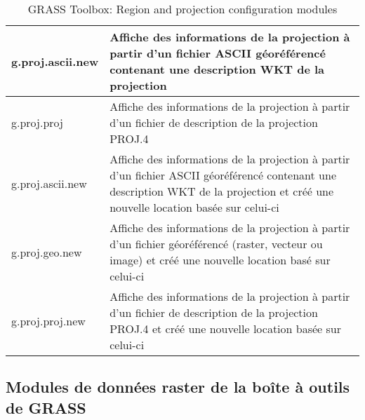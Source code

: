 \begin{table}[H]
\begin{tabular}{|p{4cm}|p{10cm}|}
  \hline g.proj.ascii.new & Affiche des informations de la projection à partir d'un fichier ASCII géoréférencé contenant une description WKT de la projection\\
  \hline g.proj.proj & Affiche des informations de la projection à partir d'un fichier de description de la projection PROJ.4 \\
  \hline g.proj.ascii.new & Affiche des informations de la projection à partir d'un fichier ASCII géoréférencé contenant une description WKT de la projection et créé une nouvelle location basée sur celui-ci \\
  \hline g.proj.geo.new &  Affiche des informations de la projection à partir d'un fichier géoréférencé (raster, vecteur ou image) et créé une nouvelle location basé sur celui-ci \\
  \hline g.proj.proj.new & Affiche des informations de la projection à partir d'un fichier de description de la projection PROJ.4 et créé une nouvelle location basée sur celui-ci \\
\hline
\end{tabular}
\caption{GRASS Toolbox: Region and projection configuration modules}
\end{table}

\subsection{Modules de données raster de la boîte à outils de GRASS}

